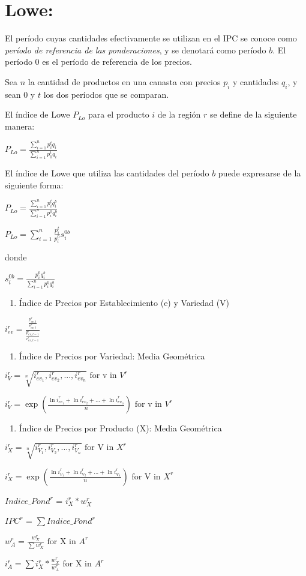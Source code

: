 \documentclass[
  landscape]{report}
\providecommand{\tightlist}{%
  \setlength{\itemsep}{0pt}\setlength{\parskip}{0pt}}\usepackage{longtable,booktabs,array}
\begin{document}
\chapter{Lowe:}\label{lowe}

El período cuyas cantidades efectivamente se utilizan en el IPC se
conoce como \emph{período de referencia de las ponderaciones}, y se
denotará como período \(b\). El período 0 es el período de referencia de
los precios.

Sea \(n\) la cantidad de productos en una canasta con precios \(p_i\) y
cantidades \(q_i\), y sean 0 y \(t\) los dos períodos que se comparan.

El índice de Lowe \(P_{Lo}\) para el producto \(i\) de la región \(r\)
se define de la siguiente manera:

\(P_{Lo}=\frac{\sum_{i=1}^n p_i^t q_i}{\sum_{i=1}^n p_0^t q_i}\)

El índice de Lowe que utiliza las cantidades del período \(b\) puede
expresarse de la siguiente forma:

\(P_{Lo}=\frac{\sum_{i=1}^n p_i^t q_i^b}{\sum_{i=1}^n p_i^0 q_i^b}\)

\(P_{Lo}=\sum_{i=1}^n \frac{p_i^t}{p_i^0} s_i^{0b}\)

donde

\(s_i^{0b}=\frac{p_i^0q_i^b}{\sum_{i=1}^n p_i^0q_i^b}\)

\begin{enumerate}
\def\labelenumi{\arabic{enumi}.}
\setcounter{enumi}{1}
\tightlist
\item
  Índice de Precios por Establecimiento (e) y Variedad (V)
\end{enumerate}

\(i_{ev}^r = \frac{\frac{p_{ev,t}^r}{c_{ev,t}^r}}{\frac{p_{ev,t-1}^r}{c_{ev,t-1}^r}}\)

\begin{enumerate}
\def\labelenumi{\arabic{enumi}.}
\setcounter{enumi}{2}
\tightlist
\item
  Índice de Precios por Variedad: Media Geométrica
\end{enumerate}

\(i_V^r = \sqrt[n]{{i_{ev_1}^r,i_{ev_2}^r,...,i_{ev_n}^r}} \text{ for v in } V^r\)

\(i_V^r = \exp (\frac{{\ln i_{ev_1}^r + \ln i_{ev_2}^r +...+\ln i_{ev_n}^r}}{n}) \text{ for v in } V^r\)

\begin{enumerate}
\def\labelenumi{\arabic{enumi}.}
\setcounter{enumi}{3}
\tightlist
\item
  Índice de Precios por Producto (X): Media Geométrica
\end{enumerate}

\(i_X^r = \sqrt[n]{{i_{V_1}^r,i_{V_2}^r,...,i_{V_n}^r}} \text{ for V in } X^r\)

\(i_X^r = \exp (\frac{{\ln i_{V_1}^r + \ln i_{V_2}^r +...+\ln i_{V_n}^r}}{n}) \text{ for V in } X^r\)

\(Indice\_Pond^r\) = \(i_X^r * w_X^r\)

\(IPC^r\) = \(\sum{Indice\_Pond^r}\)

\(w_A^r = \frac{w_X^r}{\sum w_X^r} \text{ for X in } A^r\)

\(i_A^r = \sum i_X^r * \frac{w_X^r}{w_A^r} \text{ for X in } A^r\)
\end{document}
